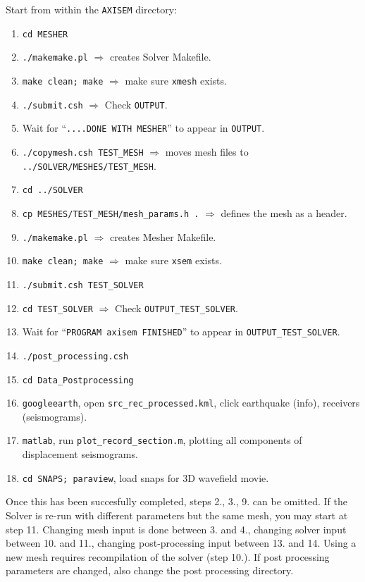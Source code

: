 \documentclass[11pt,letter,fleqn,english,notitlepage]{article}
\begin{document}
\noindent Start from within the {\tt AXISEM} directory:
\begin{enumerate}
\item {\tt cd MESHER}
\item {\tt ./makemake.pl} $\Rightarrow$ creates Solver Makefile.
\item {\tt make clean; make} $\Rightarrow$ make sure {\tt xmesh} exists.
\item {\tt ./submit.csh} $\Rightarrow$ Check {\tt OUTPUT}.
\item Wait for ``{\tt ....DONE WITH MESHER}'' to appear in {\tt OUTPUT}.
\item {\tt ./copymesh.csh TEST\_MESH} $\Rightarrow$ moves mesh files to {\tt ../SOLVER/MESHES/TEST\_MESH}.
\item {\tt cd ../SOLVER}
\item {\tt cp MESHES/TEST\_MESH/mesh\_params.h .} $\Rightarrow$ defines the mesh as a header.
\item {\tt ./makemake.pl} $\Rightarrow$ creates Mesher Makefile.
\item {\tt make clean; make} $\Rightarrow$ make sure {\tt xsem} exists.
\item {\tt ./submit.csh TEST\_SOLVER} 
\item {\tt cd TEST\_SOLVER} $\Rightarrow$ Check {\tt OUTPUT\_TEST\_SOLVER}.
\item Wait for ``{\tt  PROGRAM axisem FINISHED}'' to appear in {\tt OUTPUT\_TEST\_SOLVER}.
\item {\tt ./post\_processing.csh}
\item {\tt cd Data\_Postprocessing} 
\item {\tt googleearth}, open {\tt src\_rec\_processed.kml}, click earthquake (info), receivers (seismograms).
\item {\tt matlab}, run {\tt plot\_record\_section.m}, plotting all components of displacement seismograms.
\item {\tt cd SNAPS; paraview}, load snaps for 3D wavefield movie.
\end{enumerate}
Once this has been succesfully completed, steps 2., 3., 9. can be omitted. If the Solver is re-run with different parameters but the
same mesh, you may start at step 11. Changing mesh input is done between 3. and 4., changing solver input between 10. and 11.,
changing post-processing input between 13. and 14. Using a new mesh requires recompilation of the solver (step 10.). If post
processing parameters are changed, also change the post processing directory.
\end{document}
